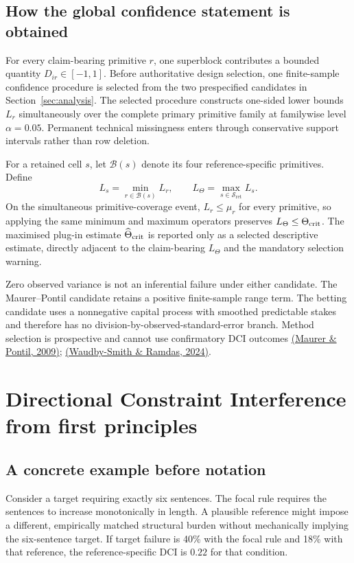 \documentclass[11pt,a4paper]{article}
\newcommand{\Sc}{\mathcal S_{\mathrm{ret}}}
\begin{document}
\subsection{How the global confidence statement is obtained}
For every claim-bearing primitive $r$, one superblock contributes a bounded quantity $D_{ir}\in[-1,1]$. Before authoritative design selection, one finite-sample confidence procedure is selected from the two prespecified candidates in Section~\ref{sec:analysis}. The selected procedure constructs one-sided lower bounds $L_r$ simultaneously over the complete primary primitive family at familywise level $\alpha=0.05$. Permanent technical missingness enters through conservative support intervals rather than row deletion.

For a retained cell $s$, let $\mathcal B(s)$ denote its four reference-specific primitives. Define
\[
L_s=\min_{r\in\mathcal B(s)}L_r,
\qquad
L_\Theta=\max_{s\in\Sc}L_s.
\]
On the simultaneous primitive-coverage event, $L_r\le\mu_r$ for every primitive, so applying the same minimum and maximum operators preserves $L_\Theta\le\Theta_{\rm crit}$. The maximised plug-in estimate $\widehat\Theta_{\rm crit}$ is reported only as a selected descriptive estimate, directly adjacent to the claim-bearing $L_\Theta$ and the mandatory selection warning.

Zero observed variance is not an inferential failure under either candidate. The Maurer--Pontil candidate retains a positive finite-sample range term. The betting candidate uses a nonnegative capital process with smoothed predictable stakes and therefore has no division-by-observed-standard-error branch. Method selection is prospective and cannot use confirmatory DCI outcomes \href{https://arxiv.org/abs/0907.3740}{(Maurer \& Pontil, 2009)}; \href{https://doi.org/10.1093/jrsssb/qkad009}{(Waudby-Smith \& Ramdas, 2024)}.

\section{Directional Constraint Interference from first principles}

\subsection{A concrete example before notation}

Consider a target requiring exactly six sentences. The focal rule requires the sentences to increase monotonically in length. A plausible reference might impose a different, empirically matched structural burden without mechanically implying the six-sentence target. If target failure is 40\% with the focal rule and 18\% with that reference, the reference-specific DCI is $0.22$ for that condition.
\end{document}
